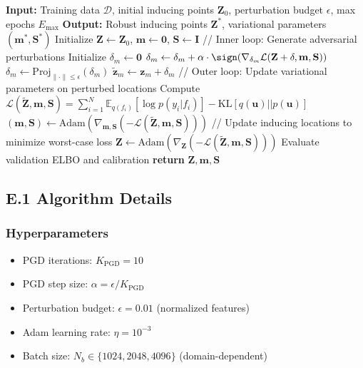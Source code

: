 \documentclass[12pt]{article}
\newcommand{\E}{\mathbb{E}}
\begin{document}
\begin{algorithm}[H]
\caption{Adversarially-Robust Inducing Point Optimization}
\begin{algorithmic}[1]
\STATE \textbf{Input:} Training data $\mathcal{D}$, initial inducing points $\mathbf{Z}_0$, perturbation budget $\epsilon$, max epochs $E_{\max}$
\STATE \textbf{Output:} Robust inducing points $\mathbf{Z}^*$, variational parameters $(\mathbf{m}^*, \mathbf{S}^*)$
\STATE Initialize $\mathbf{Z} \leftarrow \mathbf{Z}_0$, $\mathbf{m} \leftarrow \mathbf{0}$, $\mathbf{S} \leftarrow \mathbf{I}$
    \STATE // Inner loop: Generate adversarial perturbations
        \STATE Initialize $\delta_m \leftarrow \mathbf{0}$
            \STATE $\delta_m \leftarrow \delta_m + \alpha \cdot \sign(\nabla_{\delta_m} \mathcal{L}(\mathbf{Z} + \delta, \mathbf{m}, \mathbf{S}))$
            \STATE $\delta_m \leftarrow \text{Proj}_{\|\cdot\| \leq \epsilon}(\delta_m)$
        \ENDFOR
        \STATE $\tilde{\mathbf{z}}_m \leftarrow \mathbf{z}_m + \delta_m$
    \ENDFOR
    \STATE // Outer loop: Update variational parameters on perturbed locations
    \STATE Compute $\mathcal{L}(\tilde{\mathbf{Z}}, \mathbf{m}, \mathbf{S}) = \sum_{i=1}^N \E_{q(f_i)}[\log p(y_i|f_i)] - \text{KL}[q(\mathbf{u})||p(\mathbf{u})]$
    \STATE $(\mathbf{m}, \mathbf{S}) \leftarrow \text{Adam}(\nabla_{\mathbf{m}, \mathbf{S}} (-\mathcal{L}(\tilde{\mathbf{Z}}, \mathbf{m}, \mathbf{S})))$
    \STATE // Update inducing locations to minimize worst-case loss
    \STATE $\mathbf{Z} \leftarrow \text{Adam}(\nabla_{\mathbf{Z}} (-\mathcal{L}(\tilde{\mathbf{Z}}, \mathbf{m}, \mathbf{S})))$
        \STATE Evaluate validation ELBO and calibration
    \ENDIF
\ENDFOR
\STATE \textbf{return} $\mathbf{Z}, \mathbf{m}, \mathbf{S}$
\end{algorithmic}
\end{algorithm}

\subsection{E.1 Algorithm Details}

\subsubsection{Hyperparameters}
\begin{itemize}
\item PGD iterations: $K_{\text{PGD}} = 10$
\item PGD step size: $\alpha = \epsilon / K_{\text{PGD}}$
\item Perturbation budget: $\epsilon = 0.01$ (normalized features)
\item Adam learning rate: $\eta = 10^{-3}$
\item Batch size: $N_b \in \{1024, 2048, 4096\}$ (domain-dependent)
\end{itemize}
\end{document}
